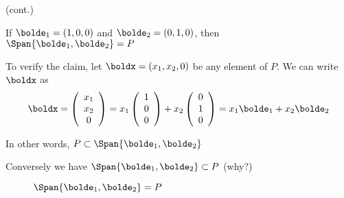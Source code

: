 \begin{frame}

    \vspace{2em}
    \Eg (cont.)
    
    If $\bolde_1 = (1,0,0)$ and $\bolde_2=(0,1,0)$, then $\Span\{\bolde_1, \bolde_2\} = P$ 
    
   To verify the claim, let $\boldx = (x_1, x_2, 0)$ be any element of $P$. 
   We can write $\boldx$ as  
    \begin{equation*}
        \boldx = 
        \left(
        \begin{array}{c}
            x_1 \\
            x_2 \\
            0
        \end{array}
        \right)
        =
        x_1
        \left(
        \begin{array}{c}
            1 \\
            0 \\
            0
        \end{array}
        \right)
        + 
        x_2
        \left(
        \begin{array}{c}
            0 \\
            1 \\
            0
        \end{array}
        \right)
        = x_1 \bolde_1 + x_2 \bolde_2
    \end{equation*}

    In other words, $P \subset \Span\{\bolde_1, \bolde_2\}$

    Conversely we have $\Span\{\bolde_1, \bolde_2\} \subset P$ (why?)


\end{frame}


\begin{frame}

    \vspace{2em}
    \begin{figure}
       \begin{center}
       \end{center}
       \caption{$\Span\{\bolde_1, \bolde_2\} = P$}
    \end{figure}


\end{frame}

